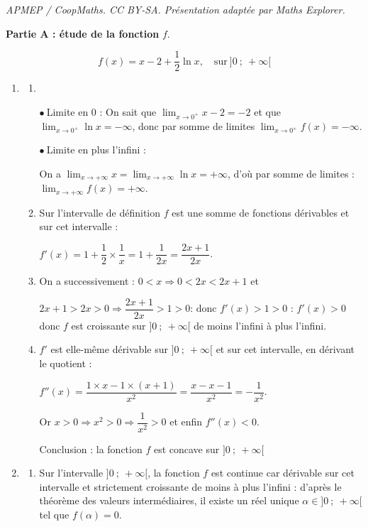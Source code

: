 \documentclass[10pt]{article}
\begin{document}
\noindent\textit{APMEP / CoopMaths. CC BY-SA. Présentation adaptée par Maths Explorer.}\par\medskip
\medskip

\textbf{Partie A : étude de la fonction} \boldmath $f$\unboldmath.

\medskip

\[f(x)  = x - 2 + \dfrac12 \ln x,\quad \text{sur}\:]0~;~+ \infty[\]

\begin{enumerate}
\item 
	\begin{enumerate}
		\item ~
		
$\bullet~$Limite en 0  : On sait que $\displaystyle\lim_{x \to 0^+} x - 2 = - 2$ et que $\displaystyle\lim_{x \to 0^+} \ln x = - \infty$, donc par somme de limites $\displaystyle\lim_{x \to 0^+} f(x) = - \infty$.

$\bullet~$Limite en plus l'infini : 

On a $\displaystyle\lim_{x \to + \infty} x = \displaystyle\lim_{x \to + \infty} \ln x = + \infty$, d'où par somme de limites : $\displaystyle\lim_{x \to + \infty} f(x) = + \infty$.
		\item Sur l'intervalle de définition $f$ est une somme de fonctions dérivables et sur cet intervalle : 
		
$f'(x) = 1 + \dfrac12 \times \dfrac 1x = 1 + \dfrac {1}{2x} = \dfrac{2x + 1}{2x}$.
		\item On a successivement : $0 < x \Rightarrow 0 < 2x < 2x + 1$ et 
		
		$2x + 1 > 2x > 0 \Rightarrow \dfrac{2x + 1}{2x} > 1 > 0 $: donc $f'(x) > 1 > 0$ : $f'(x) > 0$ donc $f$ est croissante sur $]0~;~+ \infty[$ de moins l'infini à plus l'infini.
		\item $f'$ est elle-même dérivable sur $]0~;~+ \infty[$ et sur cet intervalle, en dérivant le quotient :
		
$f''(x) = \dfrac{1 \times x - 1 \times (x + 1)}{x^2} = \dfrac{x - x - 1}{x^2} = - \dfrac{1}{x^2}$.
		
Or $x > 0 \Rightarrow x^2 > 0 \Rightarrow \dfrac{1}{x^2} > 0$ et enfin $f''(x) < 0$.
		
Conclusion : la fonction $f$ est concave sur $]0~;~+ \infty[$
	\end{enumerate}
\item 
	\begin{enumerate}
		\item  Sur l'intervalle $]0~;~+ \infty[$, la fonction $f$ est continue car dérivable sur cet intervalle et strictement croissante de moins à plus l'infini : d'après le théorème des valeurs intermédiaires, il existe un réel unique $\alpha \in]0~;~+ \infty[$ tel que $f(\alpha) = 0$.
		

\end{enumerate}
\end{enumerate}
\end{document}
